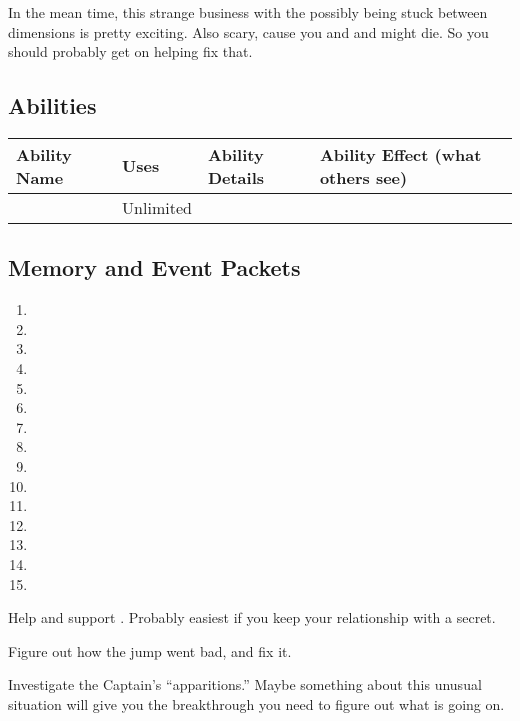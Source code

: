 \documentclass[char]{TMFHope}
\begin{document}
In the mean time, this strange business with the \pNew{} possibly being stuck between dimensions is pretty exciting. Also scary, cause you and \cMed{} and \cXO{} might die. So you should probably get on helping fix that.

\subsection*{Abilities}
\begin{tabular}{|p{3cm}|p{1.5cm}|p{8cm}|p{3.5cm}|} 
 \hline
 \textbf{Ability Name} & \textbf{Uses} & \textbf{Ability Details} & \textbf{Ability Effect (what others see)} \\ 
\hline
 \aEngineering{\MYname} & Unlimited & \aEngineering{\MYtext} & \aEngineering{\MYeffect}\\ 
 \hline
\end{tabular}

\subsection*{Memory and Event Packets}
\begin{enumerate}
	\item \mPractice{\MYname}
	\item \mSciOne{\MYname}
	\item \mSciTwo{\MYname}
	\item \mSciThree{\MYname}
	\item \mSciFour{\MYname}
	\item \mSciFive{\MYname}
	\item \mSciSix{\MYname}
	\item \mSciSeven{\MYname}
	\item \mBroom{\MYname}
	\item \mLab{\MYname}
	\item \mPatient{\MYname}
	\item \mKitchen{\MYname}
	\item \mWeight{\MYname}
	\item \mTheater{\MYname}
	\item \mCrates{\MYname}
\end{enumerate}

\begin{itemz}[Goals]
	\item Help and support \cXO{}. Probably easiest if you keep your relationship with \cXO{\them} a secret.
	\item Figure out how the jump went bad, and fix it.
	\item Investigate the Captain's ``apparitions.''  Maybe something about this unusual situation will give you the breakthrough you need to figure out what is going on.
\end{itemz}
\end{document}

